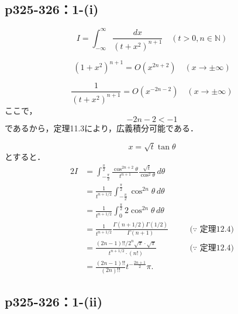 \documentclass[a4paper,10pt,fleqn]{ltjsarticle}
\begin{document}
    \newpage 

    \subsection*{p325-326：1-(i)}

\begin{tleftbar}
\[
I = \int_{-\infty}^{\infty} \frac{dx}{(t+x^2)^{n+1}} \quad (t > 0, n \in \mathbb{N})
\]

\[
(1+x^2)^{n+1} = O(x^{2n+2}) \quad (x \to \pm \infty)
\]

\[
\frac{1}{(t+x^2)^{n+1}} = O(x^{-2n-2}) \quad (x \to \pm \infty)
\]
ここで，
\[
-2n-2 < -1
\]
であるから，定理11.3により，広義積分可能である．

\[
x = \sqrt{t} \tan \theta 
\]
とすると．
\begin{alignat*}{2}
I &= \int_{-\frac{\pi}{2}}^{\frac{\pi}{2}} \frac{\cos^{2n+2} \theta}{t^{n+1} } \frac{\sqrt{t}}{\cos^2 \theta} \, d \theta &&\\
&= \frac{1}{t^{n+1/2}} \int_{-\frac{\pi}{2}}^{\frac{\pi}{2}} \cos^{2n} \theta \, d\theta &&\\
& = \frac{1}{t^{n+1/2}} \int_{0}^{\frac{\pi}{2}} 2 \cos^{2n} \theta \, d\theta&&  \\
& = \frac{1}{t^{n+1/2}} \frac{\Gamma (n+1/2) \Gamma (1/2)}{\Gamma(n+1)} & \quad & \text{($\because$~定理12.4)}\\
& = \frac{(2n-1)!! / 2^n \sqrt{\pi} \cdot \sqrt{\pi}}{t^{n+1/2} \cdot (n!)} & \quad & \text{($\because$~定理12.4)}\\\
& = \frac{(2n-1)!!}{(2n)!!} t^{ - \frac{2n+1}{2}} \pi .
\end{alignat*}
\end{tleftbar}


\newpage


\subsection*{p325-326：1-(ii)}
\end{document}
